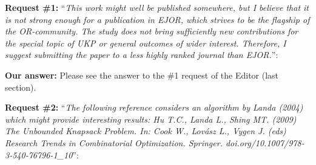 \documentclass{elsarticle}
\begin{document}
\textbf{Request \#1:} ``\textit{This work might well be published somewhere, but I believe that it is not strong enough for a publication in EJOR, which strives to be the flagship of the OR-community. The study does not bring sufficiently new contributions for the special topic of UKP or general outcomes of wider interest. Therefore, I suggest submitting the paper to a less highly ranked journal than EJOR.}'':

\textbf{Our answer:} Please see the answer to the \#1 request of the Editor (last section).
\medskip

\textbf{Request \#2:} ``\textit{The following reference considers an algorithm by Landa (2004) which might provide interesting results: Hu T.C., Landa L., Shing MT. (2009) The Unbounded Knapsack Problem. In: Cook W., Lovász L., Vygen J. (eds) Research Trends in Combinatorial Optimization. Springer. doi.org/10.1007/978-3-540-76796-1\_10}'':
\end{document}
